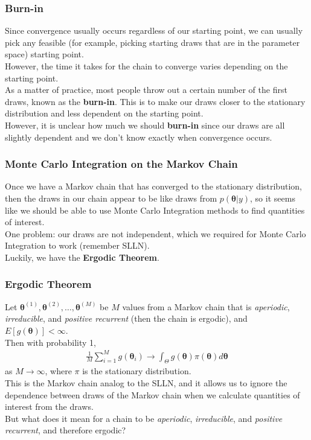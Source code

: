 \documentclass{beamer}
\begin{document}
\begin{frame}
\frametitle{Burn-in}
\pause
Since convergence usually occurs regardless of our starting point, we
can usually pick any feasible (for example, picking starting draws
that are in the parameter space) starting point.\\
\bigskip
\pause 
However, the time it takes for the chain to converge varies depending
on the starting point.\\
\bigskip
\pause
As a matter of practice, most people throw out a certain number of the
first draws, known as the \textbf{burn-in}.  This is to make our draws
closer to the stationary distribution and less dependent on the
starting point.\\
\bigskip
\pause
However, it is unclear how much we should \textbf{burn-in} since our
draws are all slightly dependent and we don't know exactly when
convergence occurs.  
\end{frame}

\begin{frame}
\frametitle{Monte Carlo Integration on the Markov Chain}
\pause
Once we have a Markov chain that has converged to the stationary
distribution, then the draws in our chain appear to be like draws from
$p(\bm{\theta} | y)$, \pause so it seems like we should be able to use Monte
Carlo Integration methods to find quantities of interest.\\
\bigskip
\pause
One problem: our draws are not independent, which we required for
Monte Carlo Integration to work (remember SLLN).\\
\bigskip
\pause
Luckily, we have the \textbf{Ergodic Theorem}.
\end{frame}

\begin{frame}
\frametitle{Ergodic Theorem}
\pause
Let $\bm{\theta}^{(1)},\bm{\theta}^{(2)}, \dots, \bm{\theta}^{(M)}$ be
$M$ values from a Markov chain that is \textit{aperiodic},
\textit{irreducible}, and \textit{positive recurrent} (then the chain
is ergodic), and $E[g(\bm{\theta})] < \infty$.\\
\bigskip
\pause
Then with probability 1,
\begin{eqnarray*}
\frac{1}{M} \sum^{M}_{i=1} g(\bm{\theta}_i) \rightarrow \int_{\Theta}
g(\bm{\theta}) \pi(\bm{\theta}) d\bm{\theta}
\end{eqnarray*}
as $M \rightarrow \infty$, where $\pi$ is the stationary distribution.\\
\bigskip
\pause
This is the Markov chain analog to the SLLN, \pause and it allows us to
ignore the dependence between draws of the Markov chain when we
calculate quantities of interest from the draws.\\
\bigskip
\pause
But what does it mean for a chain to be \textit{aperiodic},
\textit{irreducible}, and \textit{positive recurrent}, and therefore ergodic? 
\end{frame}
\end{document}
